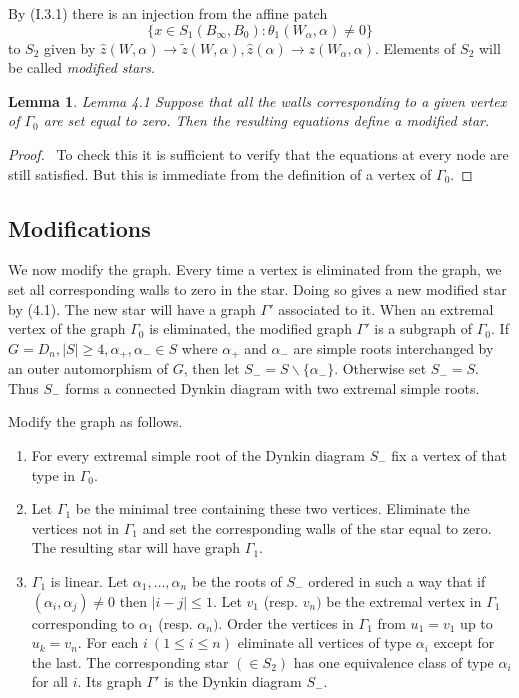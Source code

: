 \documentclass{memo-l}
\newtheorem{lemma}[theorem]{Lemma}
\theoremstyle{definition}
\theoremstyle{remark}
\numberwithin{section}{chapter}
\numberwithin{equation}{chapter}
\begin{document}
\noindent
By (I.3.1) there is an injection from the affine patch
$$
\{x  \in  S_{1}(B_{{\infty}},B_0):
{\theta}_{1}(W_{{\alpha}},{\alpha})\ne 0\}
$$
to $S_{2}$ given by $\hat z(W,{\alpha}) {\to} \tilde z (W,{\alpha}), \hat
z({\alpha}) {\to} z(W_{{\alpha}},{\alpha})$.  Elements of $S_{2}$ will be
called {\it  modified stars}.

\medskip

\begin{lemma}{Lemma 4.1} Suppose that all the walls corresponding to a
given vertex of ${\Gamma}_{0}$ are set equal to zero.  Then the resulting
equations define a modified star.
\end{lemma}

\medskip

\begin{proof} \ To check this it is sufficient to verify that the
equations at every node are still satisfied.  But this is immediate from
the definition of a vertex of ${\Gamma}_{0}$.
\end{proof}


\subsection{Modifications}

   We now modify the graph.  Every time a vertex is eliminated from the
graph, we set all corresponding walls to zero in the star.  Doing so gives
a new modified star by (4.1).  The new star will have a graph ${\Gamma}'$
associated to it.  When an extremal vertex of the graph ${\Gamma}_{0}$ is
eliminated, the modified graph ${\Gamma}'$ is a subgraph of ${\Gamma}_{0}$.
  If $G = D_{n}, \vert S\vert \ge 4,
{\alpha}_{+},{\alpha}_{-}  \in  S$ where ${\alpha}_{+}$ and ${\alpha}_{-}$
are simple roots interchanged by an outer automorphism of $G$, then let
$S_{-} = S\backslash \{{\alpha}_{-}\}$.  Otherwise set $S_-=S$.
Thus $S_{-}$ forms a connected
Dynkin diagram with two extremal simple roots.

   Modify the graph as follows.
\begin{enumerate}[label=\arabic*.]
\item For every extremal simple root of the Dynkin diagram $S_{-}$ fix a
vertex of that type in ${\Gamma}_{0}$.
\item Let ${\Gamma}_{1}$ be the minimal tree containing these two vertices.
Eliminate the vertices not in ${\Gamma}_{1}$ and set the corresponding
walls of the star equal to zero.  The resulting star will have graph
${\Gamma}_{1}$.
\item ${\Gamma}_{1}$ is linear.  Let ${\alpha}_{1},\ldots ,{\alpha}_{n}$ be
the roots of $S_{-}$ ordered in such a way that if
$({\alpha}_{i},{\alpha}_{j})\ne 0$ then $\vert i-j\vert \le 1$.  Let
$v_{1}$ (resp.  $v_{n})$ be the extremal vertex in ${\Gamma}_{1}$
corresponding to ${\alpha}_{1}$ (resp.  ${\alpha}_{n})$.  Order the
vertices in ${\Gamma}_{1}$ from $u_{1} = v_{1}$ up to $u_{k} = v_{n}$.  For
each $i\ (1 \le i \le n)$ eliminate all vertices of type ${\alpha}_{i}$
except for the last.  The corresponding star $( \in  S_{2})$ has one
equivalence class of type ${\alpha}_{i}$ for all $i$.  Its graph
${\Gamma}'$ is the Dynkin diagram $S_{-}$.
\end{enumerate}
\end{document}
